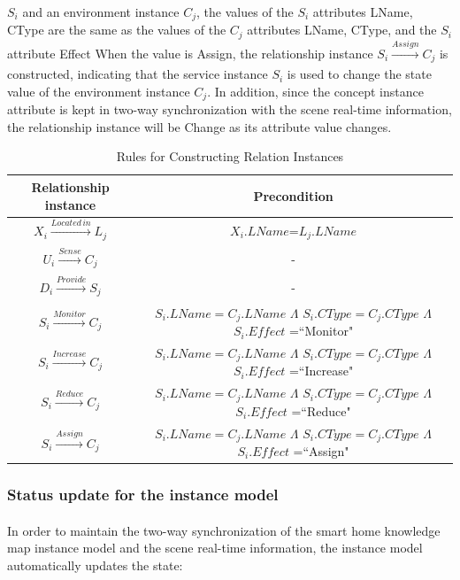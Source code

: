 $S_{i}$ and an environment instance $C_{j}$, the values of the $S_{i}$ attributes LName, CType are the same as the values of the $C_{j}$ attributes LName, CType, and the $S_{i}$ attribute Effect When the value is Assign, the relationship instance $S_{i}\xrightarrow[]{Assign}C_{j}$ is constructed, indicating that the service instance $S_{i}$ is used to change the state value of the environment instance $C_{j}$. In addition, since the concept instance attribute is kept in two-way synchronization with the scene real-time information, the relationship instance will be Change as its attribute value changes.

\begin{table}[htbp]
	\caption{Rules for Constructing Relation Instances}
	\centering  %
	\label{table5}  %
	\renewcommand\arraystretch{1.5}  %
	\begin{tabular}{|c|c|}  %
		\hline
		Relationship instance & Precondition \\
		\hline
		$X_{i}\xrightarrow[]{Located\,in}L_{j}$ & $X_{i}.LName$=$L_{j}.LName$ \\
		\hline		
		$U_{i}\xrightarrow[]{Sense} C_{j}$      & - \\
		\hline		
		$D_{i}\xrightarrow[]{Provide}S_{j}$     & - \\
		\hline		
		$S_{i}\xrightarrow[]{Monitor}C_{j}$     & $S_{i}.LName=C_{j}.LName$ $\Lambda$ $S_{i}.CType=C_{j}.CType$ $\Lambda$ $S_{i}.Effect$ =``Monitor"\\
		\hline		
		$S_{i}\xrightarrow[]{Increase}C_{j}$    & $S_{i}.LName=C_{j}.LName$ $\Lambda$ $S_{i}.CType=C_{j}.CType$ $\Lambda$ $S_{i}.Effect$ =``Increase"\\
		\hline	
		$S_{i}\xrightarrow[]{Reduce}C_{j}$      & $S_{i}.LName=C_{j}.LName$ $\Lambda$ $S_{i}.CType=C_{j}.CType$ $\Lambda$ $S_{i}.Effect$ =``Reduce"\\
		\hline
		$S_{i}\xrightarrow[]{Assign}C_{j}$      & $S_{i}.LName=C_{j}.LName$ $\Lambda$ $S_{i}.CType=C_{j}.CType$ $\Lambda$ $S_{i}.Effect$ =``Assign"\\
		\hline
	\end{tabular}
\end{table}

\subsubsection{Status update for the instance model}
\paragraph{}
In order to maintain the two-way synchronization of the smart home knowledge map instance model and the scene real-time information, the instance model automatically updates the state:

